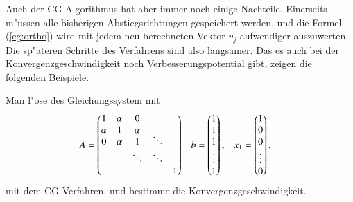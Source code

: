 Auch der CG-Algorithmus hat aber immer noch einige Nachteile.
Einerseits m"ussen alle bisherigen
Abstiegsrichtungen gespeichert werden, und die Formel (\ref{cg:ortho}) wird
mit jedem neu berechneten Vektor $v_j$ aufwendiger auszuwerten.
Die sp"ateren Schritte des Verfahrens sind also langsamer.
Das es auch bei der Konvergenzgeschwindigkeit noch Verbesserungspotential
gibt, zeigen die folgenden Beispiele.

\begin{beispiel}
Man l"ose des Gleichungssystem mit 
\begin{align*}
A&=\begin{pmatrix}
     1&\alpha&     0&      &      \\
\alpha&     1&\alpha&      &      \\
     0&\alpha&     1&\smash{\ddots}&      \\
      &      &\ddots&\ddots&      \\
      &      &      &      &     1
\end{pmatrix}
&
b&=\begin{pmatrix}1\\1\\1\\\vdots\\1\end{pmatrix},
&
x_1&=\begin{pmatrix}1\\0\\0\\\vdots\\0\end{pmatrix},
\end{align*}
mit dem CG-Verfahren, und bestimme die Konvergenzgeschwindigkeit.


\end{beispiel}
